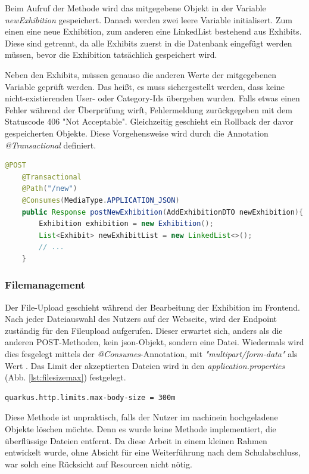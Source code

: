 Beim Aufruf der Methode wird das mitgegebene Objekt in der Variable \emph{newExhibition} gespeichert.
Danach werden zwei leere Variable initialisert. 
Zum einen eine neue Exhibition, zum anderen eine LinkedList bestehend aus Exhibits.
Diese sind getrennt, da alle Exhibits zuerst in die Datenbank eingefügt werden müssen, bevor die Exhibition tatsächlich gespeichert wird. 

Neben den Exhibits, müssen genauso die anderen Werte der mitgegebenen Variable geprüft werden. 
Das heißt, es muss sichergestellt werden, dass keine nicht-existierenden User- oder Category-Ids übergeben wurden. 
Falls etwas einen Fehler während der Überprüfung wirft, Fehlermeldung zurückgegeben mit dem Statuscode 406 "Not Acceptable". 
Gleichzeitig geschieht ein Rollback der davor gespeicherten Objekte. 
Diese Vorgehensweise wird durch die Annotation \emph{@Transactional} definiert. 

\begin{lstlisting}[label=lst:newExhibitionMethod, language=Java, caption=Methode zum Anlegen von Exhibitions]
    @POST
    @Transactional
    @Path("/new")
    @Consumes(MediaType.APPLICATION_JSON)
    public Response postNewExhibition(AddExhibitionDTO newExhibition){
        Exhibition exhibition = new Exhibition();
        List<Exhibit> newExhibitList = new LinkedList<>();
        // ...
    }
\end{lstlisting}

\subsubsection{Filemanagement}
Der File-Upload geschieht während der Bearbeitung der Exhibition im Frontend. 
Nach jeder Dateiauswahl des Nutzers auf der Webseite, wird der Endpoint zuständig für den Fileupload aufgerufen. 
Dieser erwartet sich, anders als die anderen POST-Methoden, kein \gls{json}-Objekt, sondern eine Datei. 
Wiedermals wird dies fesgelegt mittels der \emph{@Consumes}-Annotation, mit \emph{"multipart/form-data"} als Wert . 
Das Limit der akzeptierten Dateien wird in den \emph{application.properties} (Abb. \ref{lst:filesizemax}) festgelegt. 
\begin{lstlisting}[label=lst:filesizemax]
    quarkus.http.limits.max-body-size = 300m
\end{lstlisting}

Diese Methode ist unpraktisch, falls der Nutzer im nachinein hochgeladene Objekte löschen möchte. 
Denn es wurde keine Methode implementiert, die überflüssige Dateien entfernt. 
Da diese Arbeit in einem kleinen Rahmen entwickelt wurde, ohne Absicht für eine Weiterführung nach dem Schulabschluss, war solch eine Rücksicht auf Resourcen nicht nötig.

